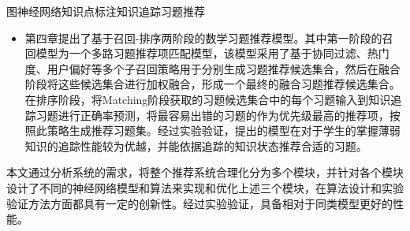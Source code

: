 \begin{abstractC}{图神经网络}{知识点标注}{知识追踪}{习题推荐}{}
\begin{itemize}
        \item 第四章提出了基于召回-排序两阶段的数学习题推荐模型。其中第一阶段的召回模型为一个多路习题推荐项匹配模型，该模型采用了基于协同过滤、热门度、用户偏好等多个子召回策略用于分别生成习题推荐候选集合，然后在融合阶段将这些候选集合进行加权融合，形成一个最终的融合习题推荐候选集合。在排序阶段，将Matching阶段获取的习题候选集合中的每个习题输入到知识追踪习题进行正确率预测，将最容易出错的习题的作为优先级最高的推荐项，按照此策略生成推荐习题集。经过实验验证，提出的模型在对于学生的掌握薄弱知识的追踪性能较为优越，并能依据追踪的知识状态推荐合适的习题。
    \end{itemize}

    本文通过分析系统的需求，将整个推荐系统合理化分为多个模块，并针对各个模块设计了不同的神经网络模型和算法来实现和优化上述三个模块，在算法设计和实验验证方法方面都具有一定的创新性。经过实验验证，具备相对于同类模型更好的性能。
\end{abstractC}
